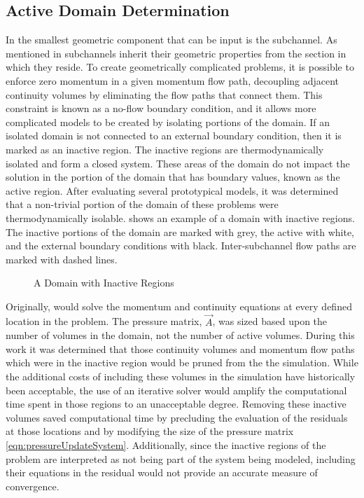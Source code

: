 \subsection{Active Domain Determination}
\label{subsect:activeDomainDetermination}
In \cobra{} the smallest geometric component that can be input is the subchannel.
As mentioned in  subchannels inherit their geometric properties from the section in which they reside.
To create geometrically complicated problems, it is possible to enforce zero momentum in a given momentum flow path, decoupling adjacent continuity volumes by eliminating the flow paths that connect them.
This constraint is known as a no-flow boundary condition, and it allows more complicated models to be created by isolating portions of the domain.
If an isolated domain is not connected to an external boundary condition, then it is marked as an inactive region.
The inactive regions are thermodynamically isolated and form a closed system.
These areas of the domain do not impact the solution in the portion of the domain that has boundary values, known as the active region.
After evaluating several prototypical models, it was determined that a non-trivial portion of the domain of these problems were thermodynamically isolable.
 shows an example of a domain with inactive regions.
The inactive portions of the domain are marked with grey, the active with white, and the external boundary conditions with black.
Inter-subchannel flow paths are marked with dashed lines.

\begin{figure}[ht!]
\centering

\caption{A Domain with Inactive Regions}
\label{fig:activeDomain}
\end{figure}

Originally, \cobra{} would solve the momentum and continuity equations at every defined location in the problem.
The pressure matrix, $\vec{A}$, was sized based upon the number of volumes in the domain, not the number of active volumes.
During this work it was determined that those continuity volumes and momentum flow paths which were in the inactive region would be pruned from the the simulation.
While the additional costs of including these volumes in the simulation have historically been acceptable, the use of an iterative solver would amplify the computational time spent in those regions to an unacceptable degree.
Removing these inactive volumes saved computational time by precluding the evaluation of the residuals at those locations and by modifying the size of the pressure matrix \eqref{eqn:pressureUpdateSystem}.
Additionally, since the inactive regions of the problem are interpreted as not being part of the system being modeled, including their equations in the residual would not provide an accurate measure of convergence.

